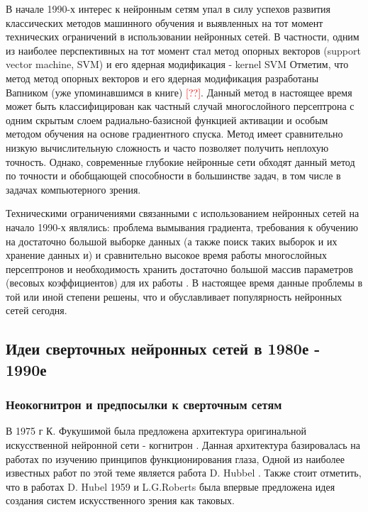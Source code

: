 \documentclass[12pt]{article}
\begin{document}
\begin{sloppypar}
В начале 1990-х интерес к нейронным сетям упал в силу успехов развития классических методов машинного обучения и выявленных на тот момент технических ограничений в использовании нейронных сетей. В частности, одним из наиболее перспективных на тот момент стал метод опорных векторов (support vector machine, SVM) и его ядерная модификация - kernel SVM Отметим, что метод метод опорных векторов и его ядерная модификация разработаны Вапником (уже упоминавшимся в книге)
\textcolor{red}{[??]}.
Данный метод в настоящее время может быть классифицирован как частный случай многослойного персептрона с одним скрытым слоем радиально-базисной функцией активации и особым методом обучения на основе градиентного спуска. Метод имеет сравнительно низкую вычислительную сложность и часто позволяет получить неплохую точность. Однако, современные глубокие нейронные сети обходят данный метод по точности и обобщающей способности в большинстве задач, в том числе в задачах компьютерного зрения. 

Техническими ограничениями связанными с использованием нейронных сетей на начало 1990-х являлись: проблема вымывания градиента, требования к обучению на достаточно большой выборке данных (а также поиск таких выборок и их хранение данных и) и сравнительно высокое время работы многослойных персептронов и необходимость хранить достаточно большой массив параметров (весовых коэффициентов) для их работы \cite{kelleher2019deep}. 
В настоящее время данные проблемы в той или иной степени решены, что и обуславливает популярность нейронных сетей сегодня. 

\newpage
\subsection{Идеи сверточных нейронных сетей в 1980е - 1990е}
\subsubsection{Неокогнитрон и предпосылки к сверточным сетям} 
В 1975 г К. Фукушимой была предложена архитектура оригинальной искусственной нейронной сети - когнитрон \cite{fukushima1975cognitron}. Данная архитектура базировалась на работах по изучению принципов функционирования глаза, Одной из наиболее известных работ по этой теме является работа D. Hubbel \cite{hubel1968receptive}. Также стоит отметить, что в работах D. Hubel 1959 \cite{hubel1959receptive} и L.G.Roberts \cite{roberts1963machine} была впервые предложена идея создания систем искусственного зрения как таковых.


\end{sloppypar}
\end{document}
